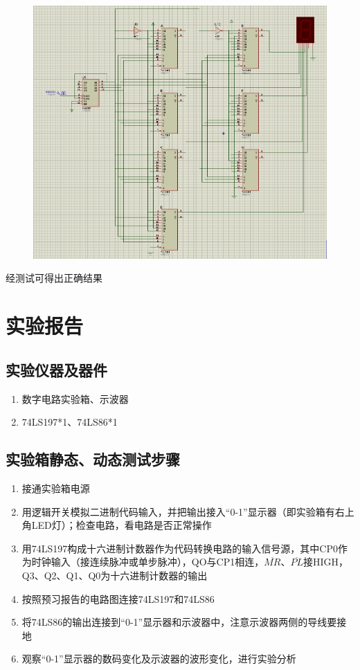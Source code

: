 \documentclass[11pt,UTF8]{ctexart}
\begin{document}
\begin{figure}[H]
\centering
\includegraphics[width=\linewidth]{fig/lab3plus2.PNG}
\label{Fig:plus2}
\end{figure}
\par 经测试可得出正确结果



\section{实验报告}
\subsection{实验仪器及器件}
\begin{enumerate}
    \item 数字电路实验箱、示波器
    \item 74LS197*1、74LS86*1
\end{enumerate}

\subsection{实验箱静态、动态测试步骤}
\begin{enumerate}
    \item 接通实验箱电源
    \item 用逻辑开关模拟二进制代码输入，并把输出接入“0-1”显示器（即实验箱有右上角LED灯）；检查电路，看电路是否正常操作
    \item 用74LS197构成十六进制计数器作为代码转换电路的输入信号源，其中CP0作为时钟输入（接连续脉冲或单步脉冲），QO与CP1相连，$\overline{MR}$、$\overline{PL}$接HIGH，Q3、Q2、Q1、Q0为十六进制计数器的输出
    \item 按照预习报告的电路图连接74LS197和74LS86
    \item 将74LS86的输出连接到“0-1”显示器和示波器中，注意示波器两侧的导线要接地
    \item 观察“0-1”显示器的数码变化及示波器的波形变化，进行实验分析
\end{enumerate}
\end{document}
